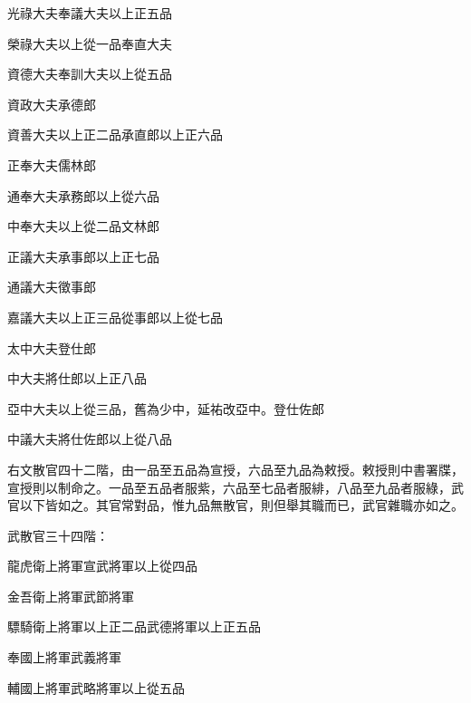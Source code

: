 \begin{pinyinscope}
 光祿大夫奉議大夫以上正五品



 榮祿大夫以上從一品奉直大夫



 資德大夫奉訓大夫以上從五品



 資政大夫承德郎



 資善大夫以上正二品承直郎以上正六品



 正奉大夫儒林郎



 通奉大夫承務郎以上從六品



 中奉大夫以上從二品文林郎



 正議大夫承事郎以上正七品



 通議大夫徵事郎



 嘉議大夫以上正三品從事郎以上從七品



 太中大夫登仕郎



 中大夫將仕郎以上正八品



 亞中大夫以上從三品，舊為少中，延祐改亞中。登仕佐郎



 中議大夫將仕佐郎以上從八品



 右文散官四十二階，由一品至五品為宣授，六品至九品為敕授。敕授則中書署牒，宣授則以制命之。一品至五品者服紫，六品至七品者服緋，八品至九品者服綠，武官以下皆如之。其官常對品，惟九品無散官，則但舉其職而已，武官雜職亦如之。



 武散官三十四階：



 龍虎衛上將軍宣武將軍以上從四品



 金吾衛上將軍武節將軍



 驃騎衛上將軍以上正二品武德將軍以上正五品



 奉國上將軍武義將軍



 輔國上將軍武略將軍以上從五品




\end{pinyinscope}
